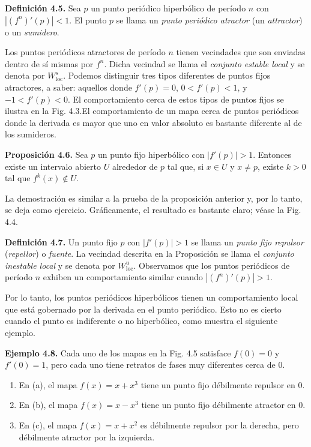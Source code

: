 \documentclass[10pt,a4paper]{book}
\begin{document}
\medskip

\textbf{Definición 4.5.} Sea $p$ un punto periódico hiperbólico de período $n$ con $|(f^{n})'(p)|<1$.  El punto $p$ se llama un \emph{punto periódico atractor} (un \emph{attractor}) o un \emph{sumidero}.

\bigskip

Los puntos periódicos atractores de período $n$ tienen vecindades que son enviadas dentro de sí mismas por $f^{n}$. Dicha vecindad se llama el \emph{conjunto estable local} y se denota por $W^{s}_{\text{loc}}$. Podemos distinguir tres tipos diferentes de puntos fijos atractores, a saber: aquellos donde $f'(p)=0$, $0<f'(p)<1$, y $-1<f'(p)<0$. El comportamiento cerca de estos tipos de puntos fijos se ilustra en la Fig. 4.3.El comportamiento de un mapa cerca de puntos periódicos donde la derivada es mayor que uno en valor absoluto es bastante diferente al de los sumideros.

\medskip

\textbf{Proposición 4.6.} Sea $p$ un punto fijo hiperbólico con $|f'(p)|>1$.  
Entonces existe un intervalo abierto $U$ alrededor de $p$ tal que, si $x \in U$ y $x \neq p$, 
existe $k>0$ tal que $f^{k}(x) \notin U$.

\medskip

La demostración es similar a la prueba de la proposición anterior y, por lo tanto, se deja como ejercicio. Gráficamente, el resultado es bastante claro; véase la Fig. 4.4.

\newpage

\textbf{Definición 4.7.} Un punto fijo $p$ con $|f'(p)|>1$ se llama un \emph{punto fijo repulsor} 
(\emph{repellor}) o \emph{fuente}.  
La vecindad descrita en la Proposición se llama el \emph{conjunto inestable local} y se denota por $W^{u}_{\text{loc}}$. Observamos que los puntos periódicos de período $n$ exhiben un comportamiento similar cuando $|(f^{n})'(p)| > 1$.

\medskip

Por lo tanto, los puntos periódicos hiperbólicos tienen un comportamiento local que está gobernado por la derivada en el punto periódico. Esto no es cierto cuando el punto es indiferente o no hiperbólico, como muestra el siguiente ejemplo.

\medskip

\textbf{Ejemplo 4.8.} Cada uno de los mapas en la Fig. 4.5 satisface $f(0)=0$ y $f'(0)=1$, pero cada uno tiene retratos de fases muy diferentes cerca de $0$.

\begin{enumerate}
\item En (a), el mapa $f(x)=x+x^{3}$ tiene un punto fijo débilmente repulsor en $0$.  

\item En (b), el mapa $f(x)=x-x^{3}$ tiene un punto fijo débilmente atractor en $0$.  

\item En (c), el mapa $f(x)=x+x^{2}$ es débilmente repulsor por la derecha, pero débilmente atractor por la izquierda.
\end{enumerate}
\end{document}

